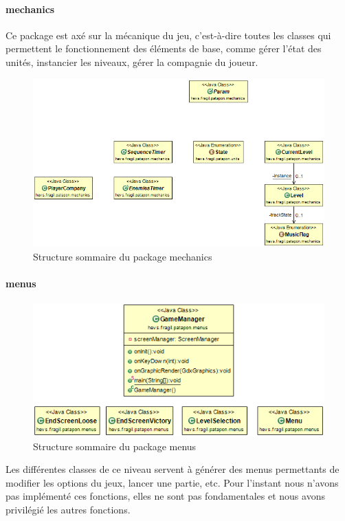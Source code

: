 \documentclass[a4paper,10pt]{article}
\begin{document}
  \paragraph{mechanics}
  Ce package est axé sur la mécanique du jeu, c'est-à-dire toutes les classes qui permettent le fonctionnement des éléments de base, comme gérer l'état des unités, instancier les niveaux, gérer la compagnie du joueur.
 \begin{figure}[!h]
 \centering
 \includegraphics[scale=0.4]{images/Mechanics}
 \caption{Structure sommaire du package mechanics}
 \end{figure}
 
  \paragraph{menus}
  \begin{figure}[!h]
 \centering
 \includegraphics[scale=0.4]{images/Menus}
 \caption{Structure sommaire du package menus}
 \end{figure}
  Les différentes classes de ce niveau servent à générer des menus permettants de modifier les options du jeux, lancer une partie, etc. Pour l'instant nous n'avons pas implémenté ces fonctions, elles ne sont pas fondamentales et nous avons privilégié les autres fonctions.
\end{document}
